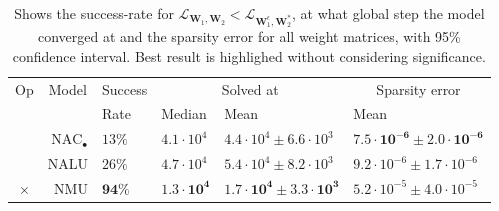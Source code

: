 \begin{table}[!h]

\caption{\label{tab:very-simple-function-results}Shows the success-rate for $\mathcal{L}_{\mathbf{W}_1, \mathbf{W}_2} < \mathcal{L}_{\mathbf{W}_1^\epsilon, \mathbf{W}_2^*}$, at what global step the model converged at and the sparsity error for all weight matrices, with 95\% confidence interval. Best result is highlighed without considering significance.}
\centering
\begin{tabular}{crllll}
\toprule
\multicolumn{1}{c}{Op} & \multicolumn{1}{c}{Model} & \multicolumn{1}{c}{Success} & \multicolumn{2}{c}{Solved at} & \multicolumn{1}{c}{Sparsity error} \\
\cmidrule(l{3pt}r{3pt}){1-1} \cmidrule(l{3pt}r{3pt}){2-2} \cmidrule(l{3pt}r{3pt}){3-3} \cmidrule(l{3pt}r{3pt}){4-5} \cmidrule(l{3pt}r{3pt}){6-6}
 &  & Rate & Median & Mean & Mean\\
\midrule
 & ${\mathrm{NAC}_\bullet}$ & $13\%$ & $4.1 \cdot 10^{4}$ & $4.4 \cdot 10^{4} \pm 6.6 \cdot 10^{3}$ & $\mathbf{7.5 \cdot 10^{-6} \pm 2.0 \cdot 10^{-6}}$\\

 & NALU & $26\%$ & $4.7 \cdot 10^{4}$ & $5.4 \cdot 10^{4} \pm 8.2 \cdot 10^{3}$ & $9.2 \cdot 10^{-6} \pm 1.7 \cdot 10^{-6}$\\

\multirow{-3}{*}{\centering\arraybackslash $\bm{\times}$} & NMU & $\mathbf{94\%}$ & $\mathbf{1.3 \cdot 10^{4}}$ & $\mathbf{1.7 \cdot 10^{4} \pm 3.3 \cdot 10^{3}}$ & $5.2 \cdot 10^{-5} \pm 4.0 \cdot 10^{-5}$\\
\bottomrule
\end{tabular}
\end{table}

